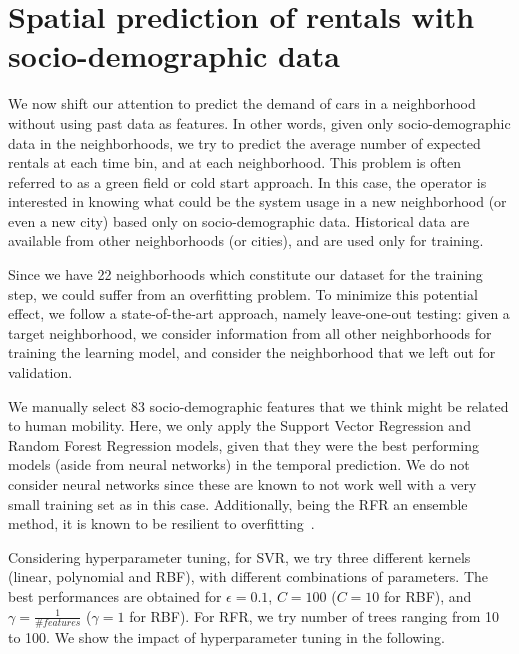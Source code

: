 \section{Spatial prediction of rentals with socio-demographic data}
\label{sec:8_5_spatial analyses}

We now shift our attention to predict the demand of cars in a neighborhood without using past data as features. In other words, given only socio-demographic data in the neighborhoods, we try to predict the average number of expected rentals at each time bin, and at each neighborhood.
This problem is often referred to as a green field or cold start approach. In this case, the operator is interested in knowing what could be the system usage in a new neighborhood (or even a new city) based only on socio-demographic data. Historical data are available from other neighborhoods (or cities), and are used only for training.

Since we have 22 neighborhoods which constitute our dataset for the training step, we could suffer from an overfitting problem. To minimize this potential effect, we follow a state-of-the-art approach, namely leave-one-out testing: given a target neighborhood, we consider information from all other neighborhoods for training the learning model, and consider the neighborhood that we left out for validation.

We manually select 83 socio-demographic features that we think might be related to human mobility.  Here, we only apply the Support Vector Regression and Random Forest Regression models, given that they were the best performing models (aside from neural networks) in the temporal prediction.
We do not consider neural networks since these are known to not work well with a very small training set as in this case.
Additionally, being the RFR an ensemble method, it is known to be resilient to overfitting~\citep{Bishop:2006}.

Considering hyperparameter tuning, for SVR, we try three different kernels (linear, polynomial and RBF), with different combinations of parameters. The best performances are obtained for $\epsilon=0.1$, $C=100$ ($C=10$ for RBF), and $\gamma=\frac{1}{\# features}$ ($\gamma=1$ for RBF). For RFR, we try number of trees ranging from 10 to 100. We show the impact of hyperparameter tuning in the following.

